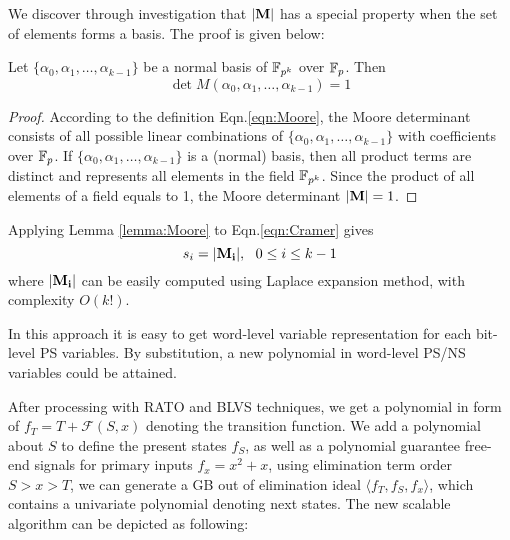 We discover through investigation that ${|\bf M}|$ has a special property when the set of elements forms a basis. The proof is given below:
\begin{Lemma}
\label{lemma:Moore}
Let $\{\alpha_0,\alpha_1,\dots,\alpha_{k-1}\}$ be a normal basis of ${\mathbb{F}}_{p^k}$ over ${\mathbb{F}}_{p}$. Then
\begin{equation}
\det{M(\alpha_0,\alpha_1,\dots,\alpha_{k-1})} = 1
\end{equation}
\end{Lemma}
\begin{proof}
According to the definition Eqn.\ref{eqn:Moore}, the Moore determinant consists of all possible linear combinations of 
$\{\alpha_0,\alpha_1,\dots,\alpha_{k-1}\}$ with coefficients over ${\mathbb{F}}_{p}$. If $\{\alpha_0,\alpha_1,\dots,\alpha_{k-1}\}$
is a (normal) basis, then all product terms are distinct and represents all elements in the field ${\mathbb{F}}_{p^k}$. Since the product 
of all elements of a field equals to 1, the Moore determinant ${|\bf M}|=1$.
\end{proof}
Applying Lemma \ref{lemma:Moore} to Eqn.\ref{eqn:Cramer} gives
\begin{equation}
s_i = {|\bf M_i|},~~0\leq i\leq k-1
\end{equation}
where ${|\bf M_i|}$ can be easily computed using Laplace expansion method, with complexity $O(k!)$.

In this approach it is easy to get word-level variable representation for each bit-level PS variables. 
By substitution, a new polynomial in word-level PS/NS variables could be attained.

After processing with RATO and BLVS techniques, we get a polynomial in form of $f_T = T+\mathcal{F}(S,x)$
denoting the transition function. We add a polynomial about $S$ to define the present states $f_S$,
as well as a polynomial guarantee free-end signals for primary inputs $f_x = x^2+x$, using elimination term order $S>x>T$,
we can generate a GB out of elimination ideal $\langle f_T,f_S,f_x\rangle$, which contains a univariate
polynomial denoting next states. The new scalable algorithm can be depicted as following:

